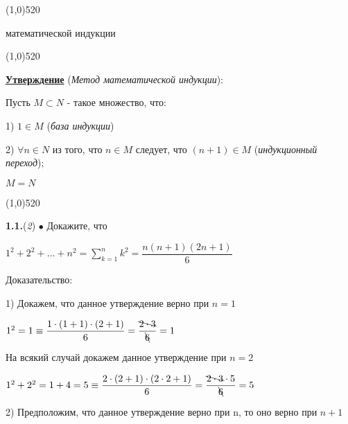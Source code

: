 \documentclass[12pt]{article}
\begin{document}
	
	\line(1,0){520}\vspace{-4mm}
	
	\begin{center}
		{ математической индукции}\vspace{-6mm}
	\end{center}
	
	\line(1,0){520}
	\medskip
	
	{\bf\underline{Утверждение}} ({\it Метод математической индукции}):
	
	Пусть $M\subset N$ - такое множество, что:
	
	1) $1\in M$ ({\it база индукции})
	
	2) $\forall n\in N$ из того, что $n\in M$ следует, что $(n+1)\in M$ ({\it индукционный переход});\vspace{1mm}
	
	 $M = N$
	
	\vspace{-1mm}
	\line(1,0){520}
	
	\vspace{4mm}
	{\bf 1.1.}({\it2}) $\bullet$ Докажите, что
	
	\vspace{3mm}
	\begin{center}
	$
	1^2+2^2+\dots+n^2 = \sum_{k=1}^{n}k^2 = \dfrac{n(n+1)(2n+1)}{6}
	$
	
	
	\end{center}
	
	
	
	\hspace{-2mm}Доказательство:
	\vspace{1mm}
	
	1) Докажем, что данное утверждение верно при $n = 1$
	
	\vspace{1mm}
	\quad$
	1^2 = 1 \equiv \dfrac{1\cdot(1+1)\cdot(2+1)}{6} = \dfrac{\bcancel{2\cdot3}}{\bcancel{6}} = 1
	$\vspace{1mm}
	
	На всякий случай докажем данное утверждение при $n=2$
	
	\vspace{1mm}
	
	\quad$
	1^2+2^2 = 1+4 = 5 \equiv \dfrac{2\cdot(2+1)\cdot(2\cdot2+1)}{6} = \dfrac{\bcancel{2\cdot3}\cdot5}{\bcancel{6}} = 5
	$
	
	\vspace{2mm}
	2) Предположим, что данное утверждение верно при n, то оно верно при $n+1$
	\medskip
	
\end{document}
